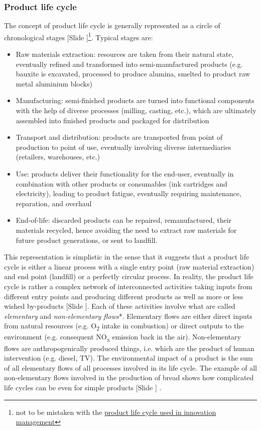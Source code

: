 \documentclass{article}
\newcounter{slide}
\begin{document}
\subsubsection{Product life cycle}
\label{sec:plc}
The concept of product life cycle is generally represented as a circle of chronological stages {\color{blue}[Slide ]}\footnote{not to be mistaken with the \href{https://en.wikipedia.org/wiki/Product_life-cycle_management_(marketing)}{product life cycle used in innovation management}}. Typical stages are:
\begin{itemize}
	\item Raw materials extraction: resources are taken from their natural state, eventually refined and transformed into semi-manufactured products (e.g. bauxite is excavated, processed to produce alumina, smelted to product raw metal aluminium blocks)
	\item Manufacturing: semi-finished products are turned into functional components with the help of diverse processes (milling, casting, etc.), which are ultimately assembled into finished products and packaged for distribution
	\item Transport and distribution: products are transported from point of production to point of use, eventually involving diverse intermediaries (retailers, warehouses, etc.)
	\item Use: products deliver their functionality for the end-user, eventually in combination with other products or consumables (ink cartridges and electricity), leading to product fatigue, eventually requiring maintenance, reparation, and overhaul
	\item End-of-life: discarded products can be repaired, remanufactured, their materials recycled, hence avoiding the need to extract raw materials for future product generations, or sent to landfill.
\end{itemize}

This representation is simplistic in the sense that it suggests that a product life cycle is either a linear process with a single entry point (raw material extraction) and end point (landfill) or a perfectly circular process. In reality, the product life cycle is rather a complex network of interconnected activities taking inputs from different entry points and producing different products as well as more or less wished by-products {\color{blue}[Slide ]}. Each of these activities involve what are called \emph{elementary} and \emph{non-elementary flows}*. Elementary flows are either direct inputs from natural resources (e.g. O\textsubscript{2} intake in combustion) or direct outputs to the environment (e.g. consequent NO\textsubscript{x} emission back in the air). Non-elementary flows are anthropogenically produced things, i.e. which are the product of human intervention (e.g. diesel, TV). The environmental impact of a product is the sum of all elementary flows of all processes involved in its life cycle. The example of all non-elementary flows involved in the production of bread shows how complicated life cycles can be even for simple products {\color{blue}[Slide ]} \cite{anderssonLifeCycleAssessment1999}.
\end{document}
